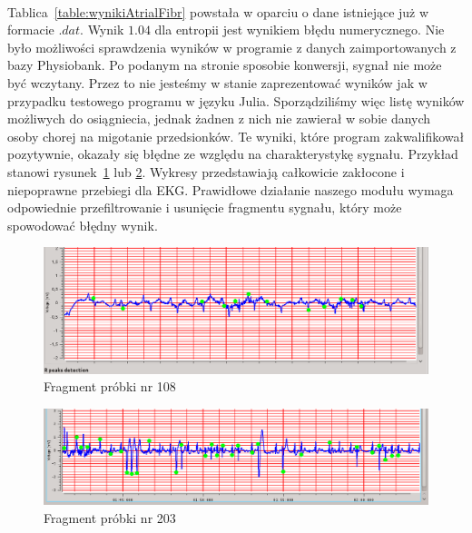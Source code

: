 \paragraph{}
Tablica~\ref{table:wynikiAtrialFibr} powstała w oparciu o dane istniejące już w formacie $.dat$. 
Wynik $1.04$ dla entropii jest wynikiem błędu numerycznego.
Nie było możliwości sprawdzenia wyników w programie z danych zaimportowanych z bazy Physiobank.
Po podanym na stronie sposobie konwersji, sygnał nie może być wczytany.
Przez to nie jesteśmy w stanie zaprezentować wyników jak w przypadku testowego programu w języku Julia.
Sporządziliśmy więc listę wyników możliwych do osiągniecia,
jednak żadnen z nich nie zawierał w sobie danych osoby chorej na migotanie przedsionków.
Te wyniki, które program zakwalifikował pozytywnie, okazały się błędne ze względu na charakterystykę sygnału.
Przykład stanowi rysunek~\ref{fig:BadSignal108} lub \ref{fig:BadSignal203}. 
Wykresy przedstawiają całkowicie zakłocone i niepoprawne przebiegi dla EKG.
Prawidłowe działanie naszego modułu wymaga odpowiednie przefiltrowanie i usunięcie fragmentu sygnału,
który może spowodować błędny wynik.

\begin{figure}[ht]
\centering
\includegraphics[width=\textwidth]{ATRIAL_FIBR/img/BadSignal108}
\caption{Fragment próbki nr 108} \label{fig:BadSignal108}
\end{figure}
\begin{figure}[ht]
\centering
\includegraphics[width=\textwidth]{ATRIAL_FIBR/img/BadSignal203}
\caption{Fragment próbki nr 203} \label{fig:BadSignal203}
\end{figure}

